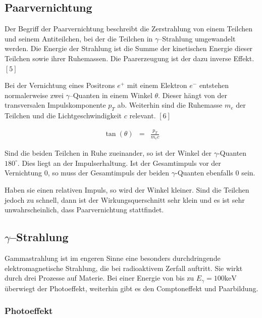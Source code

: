\documentclass[12pt,a4paper]{scrartcl}
\numberwithin{equation}{section} %
\newcommand{\pu}[1]{\ensuremath{\mathrm{#1}}}
\renewcommand{\[}{} %
\renewcommand{\]}{\noindent} %
\begin{document}
\hypertarget{paarvernichtung}{%
\subsection{Paarvernichtung}\label{paarvernichtung}}

Der Begriff der Paarvernichtung beschreibt die Zerstrahlung von einem
Teilchen und seinem Antiteilchen, bei der die Teilchen in
\(\gamma\)--Strahlung umgewandelt werden. Die Energie der Strahlung ist
die Summe der kinetischen Energie dieser Teilchen sowie ihrer
Ruhemassen. Die Paarerzeugung ist der dazu inverse Effekt. \([5]\)

Bei der Vernichtung eines Positrons \(e^+\) mit einem Elektron \(e^-\)
entstehen normalerweise zwei \(\gamma\)--Quanten in einem Winkel
\(\theta\). Dieser hängt von der transversalen Impulskomponente \(p_T\)
ab. Weiterhin sind die Ruhemasse \(m_e\) der Teilchen und die
Lichtgeschwindigkeit \(c\) relevant. \([6]\)

\[
\begin{eqnarray}
    \tan(\theta) &=& \frac{p_T}{m_ec}
\end{eqnarray}
\]

Sind die beiden Teilchen in Ruhe zueinander, so ist der Winkel der $\gamma$-Quanten $\pu{180^\circ}$. Dies liegt an der Impulserhaltung. Ist der Gesamtimpuls vor der Vernichtung $0$, so muss der Gesamtimpuls der beiden $\gamma$-Quanten ebenfalls $0$ sein.

Haben sie einen relativen
Impuls, so wird der Winkel kleiner. Sind die Teilchen jedoch zu schnell,
dann ist der Wirkungsquerschnitt sehr klein und es ist sehr
unwahrscheinlich, dass Paarvernichtung stattfindet.

\hypertarget{gammastrahlung}{%
\subsection{\texorpdfstring{\(\gamma\)--Strahlung}{\textbackslash gamma--Strahlung}}\label{gammastrahlung}}

Gammastrahlung ist im engeren Sinne eine besonders durchdringende
elektromagnetische Strahlung, die bei radioaktivem Zerfall auftritt. Sie
wirkt durch drei Prozesse auf Materie. Bei einer Energie von bis zu
\(E_\gamma = \pu{100 keV}\) überwiegt der Photoeffekt, weiterhin gibt es
den Comptoneffekt und Paarbildung.

\hypertarget{photoeffekt}{%
\subsubsection{Photoeffekt}\label{photoeffekt}}
\end{document}
